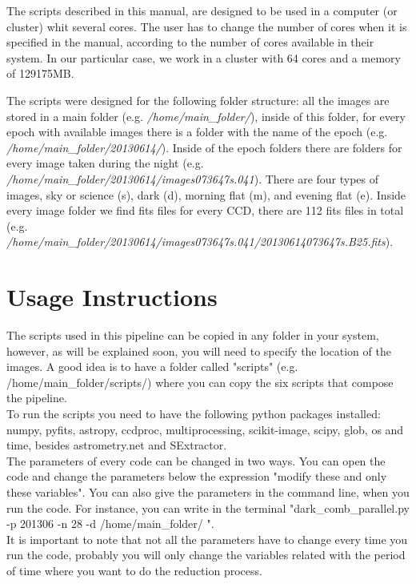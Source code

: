 \documentclass[letter, 12pt]{article}
\begin{document}
\vspace{0.2cm}

The scripts described in this manual, are designed to be used in a computer (or cluster) whit several cores. The user has to change the number of cores when it is specified in the manual, according to the number of cores available in their system. In our particular case, we work in a cluster with 64 cores and a memory of  129175MB.

\vspace{0.05cm}

The scripts were designed for the following folder structure: all the images are stored in a main folder (e.g. \emph{/home/main\_folder/}), inside of this folder,  for every epoch with available images there is a folder with the name of the epoch (e.g. \emph{/home/main\_folder/20130614/}). Inside of the epoch folders there are folders for every image taken during the night (e.g. \emph{/home/main\_folder/20130614/images073647s.041}). There are four types of images, sky or science (s), dark (d), morning flat (m), and evening flat (e). Inside every image folder we find fits files for every CCD, there are 112 fits files in total (e.g. \emph{/home/main\_folder/20130614/images073647s.041/20130614073647s.B25.fits}).

\newpage


\section{Usage Instructions}

The scripts used in this pipeline can be copied in any folder in your system, however, as will be explained soon, you will need to specify the location of the images. A good idea is to have a folder called "scripts" (e.g. /home/main\_folder/scripts/) where you can copy the six scripts that compose the pipeline. 
\\ To run the scripts you need to have the following python packages installed: numpy, pyfits, astropy, ccdproc, multiprocessing, scikit-image, scipy, glob, os and time, besides astrometry.net and SExtractor.  
\\ The parameters of every code can be changed in two ways. You can open the code and change the parameters below the expression "modify these and only these variables". You can also give the parameters in the command line, when you run the code. For instance, you can write in the terminal "dark\_comb\_parallel.py -p 201306 -n 28 -d  /home/main\_folder/ ". 
\\ It is important to note that not all the parameters have to change every time you run the code, probably you will only change the variables related with the period of time where you want to do the reduction process.
\end{document}
